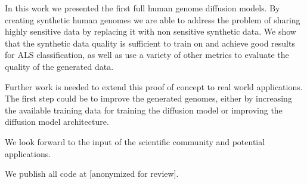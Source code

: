 
In this work we presented the first full human genome diffusion models.
By creating synthetic human genomes we are able to address the problem of sharing highly sensitive data by replacing it with non sensitive synthetic data. We show that the synthetic data quality is sufficient to train on and achieve good results for ALS classification, as well as use a variety of other metrics to evaluate the quality of the generated data.

Further work is needed to extend this proof of concept to real world applications. The first step could be to improve the generated genomes, either by increasing the available training data for training the diffusion model or improving the diffusion model architecture. 

We look forward to the input of the scientific community and potential applications.

We publish all code at [anonymized for review].